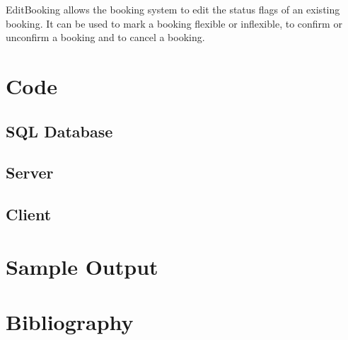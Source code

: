 \documentclass[a4paper,12pt]{article}
\begin{document}
EditBooking allows the booking system to edit the status flags of an
existing booking. It can be used to mark a booking flexible or
inflexible, to confirm or unconfirm a booking and to cancel a booking.

\section{Code}

\subsection{SQL Database}


%

\subsection{Server}

\subsection{Client}

\section{Sample Output}

\section{Bibliography}
\end{document}
